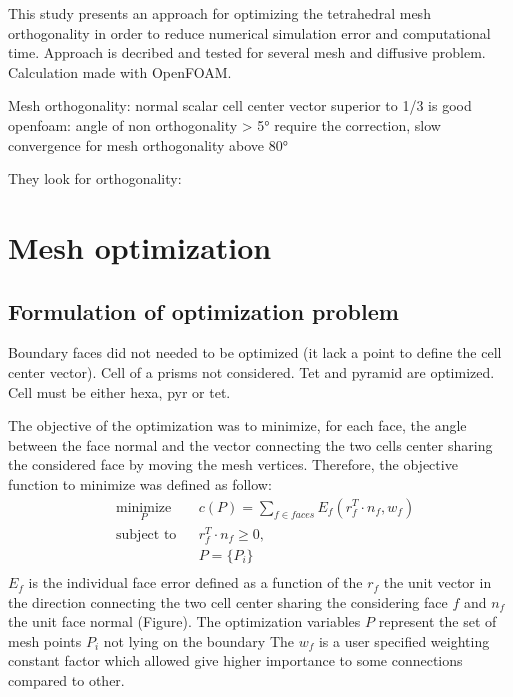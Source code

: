 \documentclass[11pt]{article}
\begin{document}
This study presents an approach for optimizing the tetrahedral mesh orthogonality in order to reduce numerical simulation error and computational time.
Approach is decribed and tested for several mesh and diffusive problem.
Calculation made with OpenFOAM.

Mesh orthogonality: normal scalar cell center vector superior to 1/3 is good %
openfoam: angle of non orthogonality > 5° require the correction, slow convergence for mesh orthogonality above 80° %

They look for orthogonality: 




\section{Mesh optimization}


\subsection{Formulation of optimization problem}

Boundary faces did not needed to be optimized (it lack a point to define the cell center vector).
Cell of a prisms not considered. Tet and pyramid are optimized. Cell must be either hexa, pyr or tet.

The objective of the optimization was to minimize, for each face, the angle between the face normal and the vector connecting the two cells center sharing the considered face by moving the mesh vertices. 
Therefore, the objective function to minimize was defined as follow:
%
\begin{equation}
\begin{aligned}
& \underset{P}{\text{minimize}}
& & c(P) = \sum_{f \in faces} E_f \left( r_f^T \cdot n_f, w_f \right)  \\
& \text{subject to}
& & r_f^T \cdot n_f \geq 0, \\
& & & P = \{P_i  \} \\
\end{aligned}
\label{eq:opt_problem}
\end{equation}
$E_f$ is the individual face error defined as a function of the $r_f$ the unit vector in the direction connecting the two cell center sharing the considering face $f$ and $n_f$ the unit face normal (Figure).
The optimization variables $P$ represent the set of mesh points $P_i$ not lying on the boundary %
The $w_f$ is a user specified weighting constant factor which allowed give higher importance to some connections compared to other.
\end{document}
